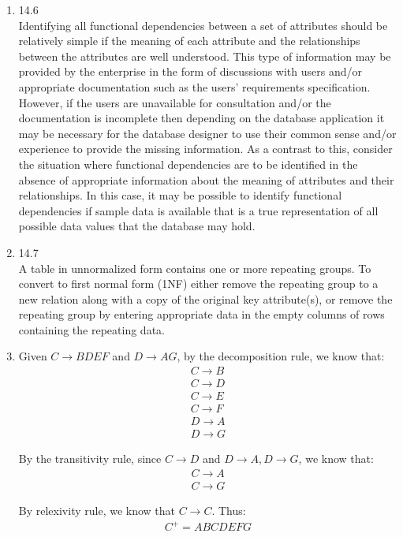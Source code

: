 \documentclass[10pt]{article}
\newcommand{\imply}{\to}
\begin{document}
\begin{enumerate}
\item 14.6\\
  Identifying all functional dependencies between a set of attributes
  should be relatively simple if the meaning of each attribute and the
  relationships between the attributes are well understood. This type
  of information may be provided by the enterprise in the form of
  discussions with users and/or appropriate documentation such as the
  users’ requirements specification. However, if the users are
  unavailable for consultation and/or the documentation is incomplete
  then depending on the database application it may be necessary for
  the database designer to use their common sense and/or experience to
  provide the missing information.
  As a contrast to this, consider the situation where functional
  dependencies are to be identified in the absence of appropriate
  information about the meaning of attributes and their
  relationships. In this case, it may be possible to identify
  functional dependencies if sample data is available that is a true
  representation of all possible data values that the database may
  hold.

\item 14.7\\
  A table in unnormalized form contains one or more repeating
  groups. To convert to first normal form (1NF) either remove the
  repeating group to a new relation along with a copy of the original
  key attribute(s), or remove the repeating group by entering
  appropriate data in the empty columns of rows containing the
  repeating data.

\item
  Given $C \imply BDEF$ and $D \imply AG$, by the decomposition rule,
  we know that:
  \begin{align*}
    C \imply B\\
    C \imply D\\
    C \imply E\\
    C \imply F\\
    D \imply A\\
    D \imply G
  \end{align*}

  By the transitivity rule, since $C \imply D$ and $D \imply A,D
  \imply G$, we know that:
  \begin{align*}
    C \imply A\\
    C \imply G
  \end{align*}

  By relexivity rule, we know that $C \imply C$. Thus:
  \begin{align*}
    C^+ = ABCDEFG
  \end{align*}


\end{enumerate}
\end{document}
